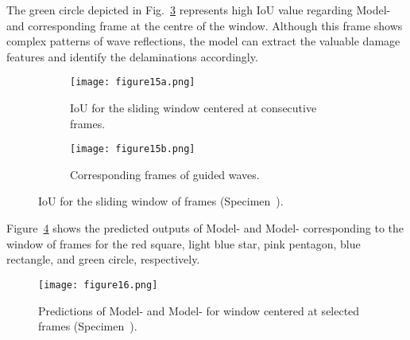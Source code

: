 \begin{sloppypar}
	The green circle depicted in Fig.~\ref{fig:L3_S4_B_333x333p_50kHz_5HC_IoU_centre_window} represents high IoU value regarding Model- and corresponding frame at the centre of the window.
	Although this frame shows complex patterns of wave reflections, the model can extract the valuable damage features and identify the delaminations accordingly.
	\begin{figure} [!ht]
		\centering
		\begin{subfigure}[b]{1\textwidth}
			\centering
			\texttt{[image: figure15a.png]}
			\caption{IoU for the sliding window centered at consecutive frames.}
			\label{fig:L3_S4_B_333x333p_50kHz_5HC_IoU}
		\end{subfigure}
		\par\medskip
		\begin{subfigure}[b]{1\textwidth}
			\centering
			\texttt{[image: figure15b.png]}
			\caption{Corresponding frames of guided waves.} 
			\label{fig:L3_S4_B_333x333p_50kHz_5HC_shapes_}
		\end{subfigure}
		\caption{IoU for the sliding window of frames (Specimen~).}
		\label{fig:L3_S4_B_333x333p_50kHz_5HC_IoU_centre_window}
	\end{figure} 
	
	Figure~\ref{fig:L3_S4_B_5HC_predictions} shows the predicted outputs of Model- and Model- corresponding to the window of frames for the red square, light blue star, pink pentagon, blue rectangle, and green circle, respectively.
	\begin{figure}[!ht]
		\centering
		\texttt{[image: figure16.png]}
		\caption{Predictions of Model- and Model- for window centered at selected frames (Specimen~).}
		\label{fig:L3_S4_B_5HC_predictions}
	\end{figure}
	

\end{sloppypar}
